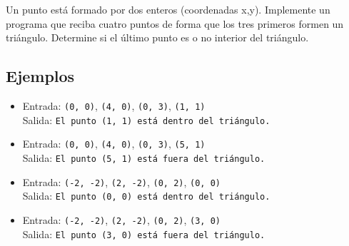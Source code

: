 Un punto está formado por dos enteros (coordenadas x,y). Implemente
un programa que reciba cuatro puntos de forma que los tres primeros formen un triángulo. Determine si el último punto es o no interior del triángulo.
\subsection*{Ejemplos}
\begin{itemize}
    \item Entrada: \texttt{(0, 0)}, \texttt{(4, 0)}, \texttt{(0, 3)}, \texttt{(1, 1)}\\
          Salida: \texttt{El punto (1, 1) está dentro del triángulo.}
    \item Entrada: \texttt{(0, 0)}, \texttt{(4, 0)}, \texttt{(0, 3)}, \texttt{(5, 1)}\\
          Salida: \texttt{El punto (5, 1) está fuera del triángulo.}
    \item Entrada: \texttt{(-2, -2)}, \texttt{(2, -2)}, \texttt{(0, 2)}, \texttt{(0, 0)}\\
          Salida: \texttt{El punto (0, 0) está dentro del triángulo.}
    \item Entrada: \texttt{(-2, -2)}, \texttt{(2, -2)}, \texttt{(0, 2)}, \texttt{(3, 0)}\\
          Salida: \texttt{El punto (3, 0) está fuera del triángulo.}
\end{itemize}
